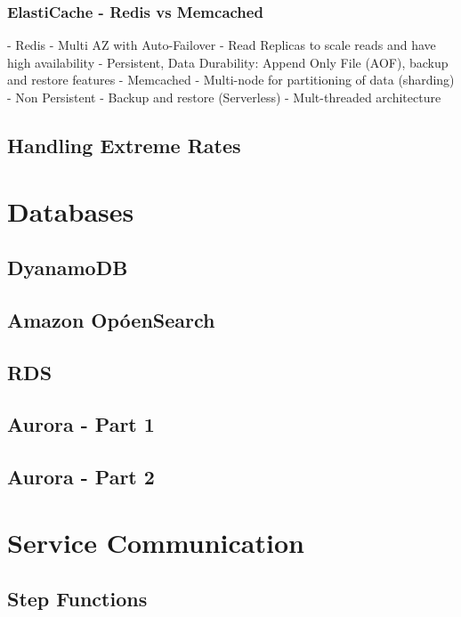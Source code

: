 \documentclass[11pt]{book}
\begin{document}
    \subsection{ElastiCache - Redis vs Memcached}
    - Redis
    - Multi AZ with Auto-Failover
    - Read Replicas to scale reads and have high availability
    - Persistent, Data Durability: Append Only File (AOF), backup and restore features
    - Memcached
    - Multi-node for partitioning of data (sharding)
    - Non Persistent
    - Backup and restore (Serverless)
    - Mult-threaded architecture


    \section{Handling Extreme Rates}


    \chapter{Databases}


    \section{DyanamoDB}


    \section{Amazon OpóenSearch}


    \section{RDS}


    \section{Aurora - Part 1}


    \section{Aurora - Part 2}


    \chapter{Service Communication}


    \section{Step Functions}
\end{document}
